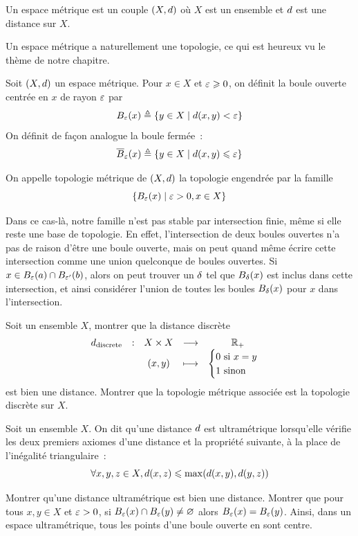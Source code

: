 \begin{definition}
  Un espace métrique est un couple $(X,\vardis)$ où $X$ est un ensemble et
  $\vardis$ est une distance sur $X$.
\end{definition}

\noindent
Un espace métrique a naturellement une topologie, ce qui est heureux vu le
thème de notre chapitre.

\begin{definition}
  Soit $(X,\vardis)$ un espace métrique. Pour $x\in X$ et $\vareps \geq 0$, on
  définit la boule ouverte centrée en $x$ de rayon $\vareps$ par
  \[\boule{x}{\vareps} \defeq \compr{y\in X}{\vardis(x,y) < \vareps}\]
  On définit de façon analogue la boule fermée~:
  \[\bouleF{x}{\vareps}\defeq \compr{y\in X}{\vardis(x,y)\leq\vareps}\]

  On appelle topologie métrique de $(X,\vardis)$ la topologie engendrée par la
  famille
  \[\compr{\boule{x}{\vareps}}{\vareps > 0, x \in X}\]
\end{definition}

\begin{remark}
  Dans ce cas-là, notre famille n'est pas stable par intersection finie, même
  si elle reste une base de topologie. En effet, l'intersection de deux boules
  ouvertes n'a pas de raison d'être une boule ouverte, mais on peut quand même
  écrire cette intersection comme une union quelconque de boules ouvertes.
  Si $x \in \boule{a}{\vareps} \cap \boule{b}{\vareps'}$, alors on peut trouver
  un $\vardel$ tel que $\boule{x}{\vardel}$ est inclus dans cette intersection,
  et ainsi considérer l'union de toutes les boules $\boule{x}{\vardel}$ pour
  $x$ dans l'intersection.
\end{remark}

\begin{exercise}
  Soit un ensemble $X$, montrer que la distance discrète
  \[
  \makeFun{\discdis}{X\times X}{\bR_+}{(x,y)}{\begin{cases}
      0 \text{ si } x = y \\
      1 \text{ sinon}
  \end{cases}}
  \]
  est bien une distance. Montrer que la topologie métrique associée est la
  topologie discrète sur $X$.
\end{exercise}

\begin{exercise}
  Soit un ensemble $X$. On dit qu'une distance $\vardis$ est ultramétrique
  lorsqu'elle vérifie les deux premiers axiomes d'une distance et la propriété
  suivante, à la place de l'inégalité triangulaire~:
  \[\forall x,y,z\in X, \vardis(x,z)\leq \max(\vardis(x,y),\vardis(y,z))\]

  Montrer qu'une distance ultramétrique est bien une distance. Montrer que pour
  tous $x,y\in X$ et $\vareps > 0$, si
  $\boule{x}{\vareps}\cap \boule{y}{\vareps}\neq\vide$ alors
  $\boule{x}{\vareps} = \boule{y}{\vareps}$. Ainsi, dans un espace
  ultramétrique, tous les points d'une boule ouverte en sont centre.
\end{exercise}

